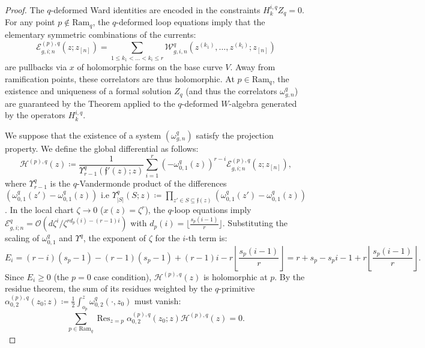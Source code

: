 \documentclass[reqno,11pt]{amsart}
\theoremstyle{plain}
\theoremstyle{definition}
\theoremstyle{remark}
\numberwithin{equation}{section}
\newcommand{\1}{\mathds{1}}
\newcommand{\2}{\frac{1}{2}}
\DeclareMathOperator*{\Res}{Res}
\begin{document}
{\begin{proof}
					{The $q$-deformed Ward identities are encoded in the constraints $H^{i,q}_k Z_q = 0$. For any point $p \notin \text{Ram}_q$, the $q$-deformed loop equations imply that the elementary symmetric combinations of the currents:
						\begin{equation}
							\mathcal{E}^{(p),q}_{g,i;n}(z; z_{[n]}) = \sum_{1 \leq k_1 < \dots < k_i \leq r} \mathcal{W}^{q}_{g,i,n}(z^{(k_1)}, \dots, z^{(k_i)}; z_{[n]})
						\end{equation}
						are pullbacks via $x$ of holomorphic forms on the base curve $V$. Away from ramification points, these correlators are thus holomorphic. At $p \in \text{Ram}_q$, the existence and uniqueness of a formal solution $Z_q$ (and thus the correlators $\omega^q_{g,n}$) are guaranteed by the %
						Theorem applied to the $q$-deformed $W$-algebra generated by the operators $H^{i,q}_k$.}
					
					{We suppose that the existence of a system $(\omega^q_{g,n})$ satisfy the projection property. We define the global differential as follows:
						\begin{equation}
							\mathcal{H}^{(p),q}(z) \coloneqq \frac{1}{\Upsilon^q_{r-1}(\mathfrak{f}'(z); z)} \sum_{i=1}^{r} (-\omega^{q}_{0,1}(z))^{r-i} \mathcal{E}^{(p),q}_{g,i;n}(z; z_{[n]}),
						\end{equation}
						where $\Upsilon^q_{r-1}$ is the $q$-Vandermonde product of the differences $(\omega^q_{0,1}(z') - \omega^q_{0,1}(z))$ i.e 
						$\Upsilon^q_{|S|}(S; z) \coloneqq \prod_{z' \in S\subseteq \mathfrak{f}(z)} \left( \omega^q_{0,1}(z') - \omega^q_{0,1}(z) \right)$.
						In the local chart $\zeta \to 0$ ($x(z)=\zeta^r$), the $q$-loop equations imply $\mathcal{E}^q_{g,i;n} = \mathcal{O}(d\zeta^i / \zeta^{r d_p(i) - (r-1)i})$ with $d_p(i) = \lfloor \frac{s_p(i-1)}{r} \rfloor$. Substituting the scaling of $\omega^q_{0,1}$ and $\Upsilon^q$, the exponent of $\zeta$ for the $i$-th term is:
						\begin{equation}
							E_i = (r-i)(s_p-1) - (r-1)(s_p-1) + (r-1)i - r \left\lfloor \frac{s_p(i-1)}{r} \right\rfloor = r + s_p - s_p i - 1 + r \left\lfloor \frac{s_p(i-1)}{r} \right\rfloor.
						\end{equation}
						Since $E_i \geq 0$ (the $p=0$ case condition), $\mathcal{H}^{(p),q}(z)$ is holomorphic at $p$. By the residue theorem, the sum of its residues weighted by the $q$-primitive $\alpha^{(p),q}_{0,2}(z_0; z) \coloneqq \frac{1}{2} \int_{o_p}^z \omega^q_{0,2}(\cdot, z_0)$ must vanish:
						\begin{equation}
							\sum_{p \in \text{Ram}_q} \Res_{z=p} \alpha^{(p),q}_{0,2}(z_0; z) \mathcal{H}^{(p),q}(z) = 0.
					\end{equation}}
					

\end{proof}}
\end{document}
